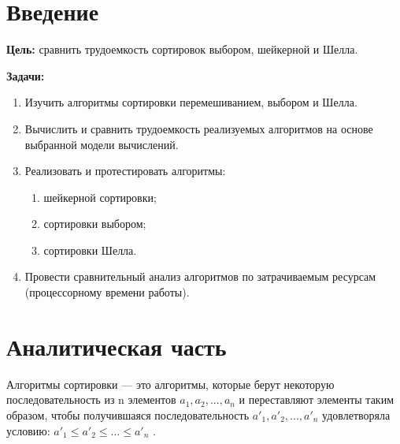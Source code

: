 \documentclass[a4paper,oneside,14pt]{extreport}
\begin{document}

\newpage
\tableofcontents
{}

\newpage

\chapter*{Введение}
\textbf{Цель:} сравнить трудоемкость сортировок выбором, шейкерной и Шелла.

\textbf{Задачи:}
\begin{enumerate}
	\item Изучить алгоритмы сортировки перемешиванием, выбором и Шелла.
	\item Вычислить и сравнить трудоемкость реализуемых алгоритмов на основе выбранной модели вычислений.
	\item Реализовать и протестировать алгоритмы:
	\begin{enumerate}
		\item шейкерной сортировки;
		\item сортировки выбором;
		\item сортировки Шелла.
	\end{enumerate}
	\item Провести сравнительный анализ алгоритмов по затрачиваемым ресурсам (процессорному времени работы).
\end{enumerate}
\newpage

\chapter{Аналитическая часть}
Алгоритмы сортировки — это алгоритмы, которые берут некоторую последовательность из n элементов $a_1, a_2,..., a_n$ и переставляют элементы таким образом, чтобы получившаяся последовательность $a'_1,a'_2,...,a'_n$ удовлетворяла условию: $a'_1 \leqslant a'_2 \leqslant ... \leqslant a'_n$ \cite{SortAlgorithms}.
\end{document}
